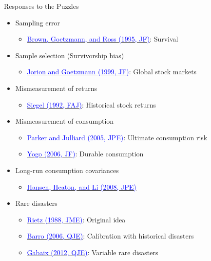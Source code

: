 \documentclass{beamer}
\begin{document}
\begin{frame}[allowframebreaks]{Responses to the Puzzles}
	\begin{itemize}
		\item Sampling error
		\begin{itemize}
			\item \href{https://doi.org/10.1111/j.1540-6261.1995.tb04039.x}{\textcolor{blue}{Brown, Goetzmann, and Ross (1995, JF)}}: Survival
		\end{itemize}
		\item Sample selection (Survivorship bias)
		\begin{itemize}
			\item \href{https://doi.org/10.1111/0022-1082.00133}{\textcolor{blue}{Jorion and Goetzmann (1999, JF)}}: Global stock markets
		\end{itemize}
		\item Mismeasurement of returns
		\begin{itemize}
			\item \href{https://doi.org/10.2469/faj.v48.n1.28}{\textcolor{blue}{Siegel (1992, FAJ)}}: Historical stock returns
		\end{itemize}
		\item Mismeasurement of consumption
		\begin{itemize}
			\item \href{https://doi.org/10.1086/426042}{\textcolor{blue}{Parker and Julliard (2005, JPE)}}: Ultimate consumption risk
			\item \href{https://doi.org/10.1111/j.1540-6261.2006.00848.x}{\textcolor{blue}{Yogo (2006, JF)}}: Durable consumption
		\end{itemize}
		\item Long-run consumption covariances
		\begin{itemize}
			\item \href{https://doi.org/10.1086/588200}{\textcolor{blue}{Hansen, Heaton, and Li (2008, JPE)}}
		\end{itemize}
		\item Rare disasters
		\begin{itemize}
			\item \href{https://doi.org/10.1016/0304-3932(88)90172-9}{\textcolor{blue}{Rietz (1988, JME)}}: Original idea
			\item \href{https://doi.org/10.1162/qjec.121.3.823}{\textcolor{blue}{Barro (2006, QJE)}}: Calibration with historical disasters
			\item \href{https://doi.org/10.1093/qje/qjs001}{\textcolor{blue}{Gabaix (2012, QJE)}}: Variable rare disasters

\end{itemize}
\end{itemize}
\end{frame}
\end{document}

